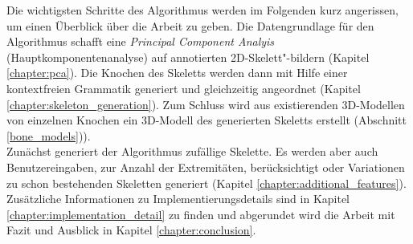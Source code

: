 Die wichtigsten Schritte des Algorithmus werden im Folgenden kurz angerissen, um einen Überblick über die Arbeit zu geben.
Die Datengrundlage für den Algorithmus schafft eine \emph{Principal Component Analyis} (Hauptkomponentenanalyse) auf annotierten 2D-Skelett"-bildern (Kapitel \ref{chapter:pca}). 
Die Knochen des Skeletts werden dann mit Hilfe einer kontextfreien Grammatik generiert und gleichzeitig angeordnet (Kapitel \ref{chapter:skeleton_generation}). 
Zum Schluss wird aus existierenden 3D-Modellen von einzelnen Knochen ein 3D-Modell des generierten Skeletts erstellt (Abschnitt \ref{bone_models})).\\
Zunächst generiert der Algorithmus zufällige Skelette. Es werden aber auch Benutzereingaben, \zb zur Anzahl der Extremitäten, berücksichtigt oder Variationen zu schon bestehenden Skeletten generiert (Kapitel \ref{chapter:additional_features}). \\
Zusätzliche Informationen zu Implementierungsdetails sind in Kapitel \ref{chapter:implementation_detail} zu finden und abgerundet wird die Arbeit mit Fazit und Ausblick in Kapitel \ref{chapter:conclusion}.



